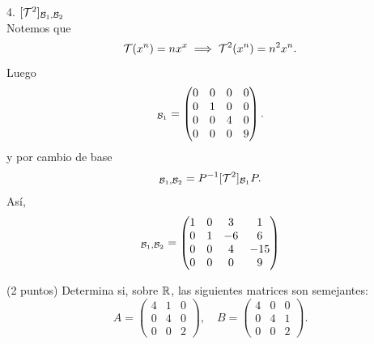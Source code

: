 \documentclass[12pt,a4paper]{article}
\begin{document}
\begin{solucion}
        4. $[\mathcal{T}^{2}]_{\mathcal{B}_{1},\mathcal{B}_{2}}$\\
        Notemos que
        \begin{equation*}
            \mathcal{T}(x^{n})=nx^{x}\implies\mathcal{T}^{2}(x^{n})=n^{2}x^{n}.
        \end{equation*}
        Luego
        \begin{equation*}
            [\TT^{2}]_{\BB_{1}}=
            \begin{pmatrix}
                0 & 0 & 0 & 0\\
                0 & 1 & 0 & 0\\
                0 & 0 & 4 & 0\\
                0 & 0 & 0 & 9
            \end{pmatrix}.
        \end{equation*}
        y por cambio de base
        \begin{equation*}
            [\TT^{2}]_{\BB_{1},\BB_{2}}=P^{-1}[\TT^{2}]_{\BB_{1}}P.
        \end{equation*}
        Así,
        \begin{equation*}
            [\TT^{2}]_{\BB_{1},\BB_{2}}=
            \begin{pmatrix}
                1 & 0 & 3 & 1\\
                0 & 1 & -6 & 6\\
                0 & 0 & 4 & -15\\
                0 & 0 & 0 & 9
            \end{pmatrix}
        \end{equation*}
    \end{solucion}

    \begin{mdframed}[style=mdpinkbox,frametitle={Ejercicio 4}]
        (2 puntos) Determina si, sobre $\mathbb{R}$, las siguientes matrices son semejantes:
        \begin{equation*}
            A=
            \begin{pmatrix}
                4 & 1 & 0\\
                0 & 4 & 0\\
                0 & 0 & 2
            \end{pmatrix},
            \quad
            B=
            \begin{pmatrix}
                4 & 0 & 0\\
                0 & 4 & 1\\
                0 & 0 & 2
            \end{pmatrix}.
        \end{equation*}
    \end{mdframed}
\end{document}
